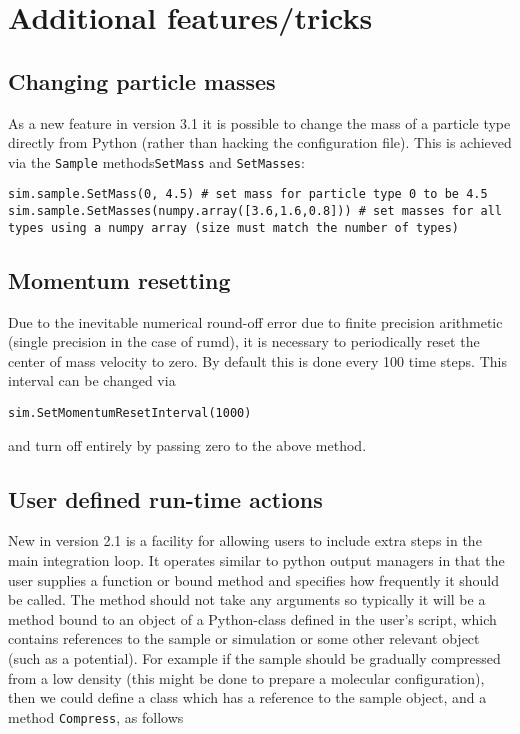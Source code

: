 \documentclass[a4paper]{article}
\begin{document}
\section{Additional features/tricks}


\subsection{Changing particle masses}

As a new feature in version 3.1 it is possible to change the mass of a particle type directly from Python (rather than hacking the configuration file). This is achieved via the \verb|Sample| methods\verb|SetMass| and \verb|SetMasses|:

\begin{verbatim}
sim.sample.SetMass(0, 4.5) # set mass for particle type 0 to be 4.5
sim.sample.SetMasses(numpy.array([3.6,1.6,0.8])) # set masses for all types using a numpy array (size must match the number of types)
\end{verbatim}

\subsection{Momentum resetting}

Due to the inevitable numerical round-off error due to finite precision
arithmetic (single precision in the case of rumd), it is necessary to 
periodically reset the center of mass velocity to zero. By default this is
done every 100 time steps. This interval can be changed via
\begin{verbatim}
sim.SetMomentumResetInterval(1000)
\end{verbatim}
and turn off entirely by passing zero to the above method.

\subsection{\label{runtime_actions}User defined run-time actions}

New in version 2.1 is a facility for allowing users to include extra steps in
the main integration loop. It operates similar to python output managers in
that the user supplies a function or bound 
method and specifies how frequently it should be
called. The method should not take any arguments so typically it will be a 
method bound to an object of a Python-class defined in the user's script,
which contains references to the sample or simulation or some other 
relevant object (such as a potential). 
For example if the sample should be gradually compressed from a low 
density (this might be done to prepare a molecular configuration), then we 
could
define a class which has a reference to the sample object, and a method
\verb|Compress|, as follows
\end{document}
